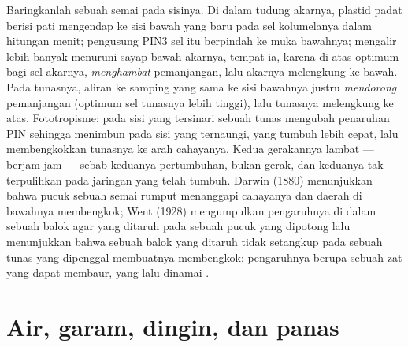 \begin{example}\label{ex:b3:plant-molecular-physiology:tropism}
Baringkanlah sebuah semai pada sisinya. Di dalam tudung akarnya, plastid padat berisi
pati mengendap ke sisi bawah yang baru pada sel kolumelanya dalam hitungan
menit; pengusung PIN3 sel itu berpindah ke muka bawahnya;
 mengalir lebih banyak menuruni sayap bawah akarnya, tempat ia, karena
di atas optimum bagi sel akarnya, \emph{menghambat} pemanjangan, lalu
akarnya melengkung ke bawah. Pada tunasnya, aliran ke samping yang sama ke sisi
bawahnya justru \emph{mendorong} pemanjangan (optimum sel tunasnya lebih tinggi),
lalu tunasnya melengkung ke atas. Fototropisme:  pada sisi yang tersinari
sebuah tunas mengubah penaruhan PIN sehingga  menimbun pada sisi yang
ternaungi, yang tumbuh lebih cepat, lalu membengkokkan tunasnya ke arah cahayanya. Kedua
gerakannya lambat --- berjam-jam --- sebab keduanya pertumbuhan, bukan gerak,
dan keduanya tak terpulihkan pada jaringan yang telah tumbuh. Darwin (1880)
menunjukkan bahwa pucuk sebuah semai rumput menanggapi cahayanya dan daerah
di bawahnya membengkok; Went (1928) mengumpulkan pengaruhnya di dalam sebuah balok agar yang ditaruh
pada sebuah pucuk yang dipotong lalu menunjukkan bahwa sebuah balok yang ditaruh tidak setangkup pada sebuah
tunas yang dipenggal membuatnya membengkok: pengaruhnya berupa sebuah zat yang dapat membaur, yang
lalu dinamai .
\end{example}

\section{Air, garam, dingin, dan panas}

